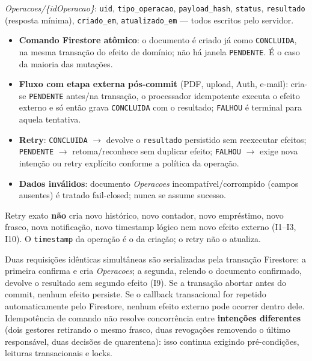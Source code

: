 \begin{regra}
\textit{Operacoes/\{idOperacao\}}: \texttt{uid}, \texttt{tipo\_operacao}, \texttt{payload\_hash}, \texttt{status}, \texttt{resultado} (resposta mínima), \texttt{criado\_em}, \texttt{atualizado\_em} — todos escritos pelo servidor.
\begin{itemize}
    \item \textbf{Comando Firestore atômico}: o documento é criado já como \texttt{CONCLUIDA}, na mesma transação do efeito de domínio; não há janela \texttt{PENDENTE}. É o caso da maioria das mutações.
    \item \textbf{Fluxo com etapa externa pós-commit} (PDF, upload, Auth, e-mail): cria-se \texttt{PENDENTE} antes/na transação, o processador idempotente executa o efeito externo e só então grava \texttt{CONCLUIDA} com o resultado; \texttt{FALHOU} é terminal para aquela tentativa.
    \item \textbf{Retry}: \texttt{CONCLUIDA} $\rightarrow$ devolve o \texttt{resultado} persistido sem reexecutar efeitos; \texttt{PENDENTE} $\rightarrow$ retoma/reconhece sem duplicar efeito; \texttt{FALHOU} $\rightarrow$ exige nova intenção ou retry explícito conforme a política da operação.
    \item \textbf{Dados inválidos}: documento \textit{Operacoes} incompatível/corrompido (campos ausentes) é tratado fail-closed; nunca se assume sucesso.
\end{itemize}
Retry exato \textbf{não} cria novo histórico, novo contador, novo empréstimo, novo frasco, nova notificação, novo timestamp lógico nem novo efeito externo (I1--I3, I10). O \texttt{timestamp} da operação é o da criação; o retry não o atualiza.
\end{regra}

\begin{regra}[Concorrência]
Duas requisições idênticas simultâneas são serializadas pela transação Firestore: a primeira confirma e cria \textit{Operacoes}; a segunda, relendo o documento confirmado, devolve o resultado sem segundo efeito (I9). Se a transação abortar antes do commit, nenhum efeito persiste. Se o callback transacional for repetido automaticamente pelo Firestore, nenhum efeito externo pode ocorrer dentro dele. Idempotência de comando não resolve concorrência entre \textbf{intenções diferentes} (dois gestores retirando o mesmo frasco, duas revogações removendo o último responsável, duas decisões de quarentena): isso continua exigindo pré-condições, leituras transacionais e locks.
\end{regra}

